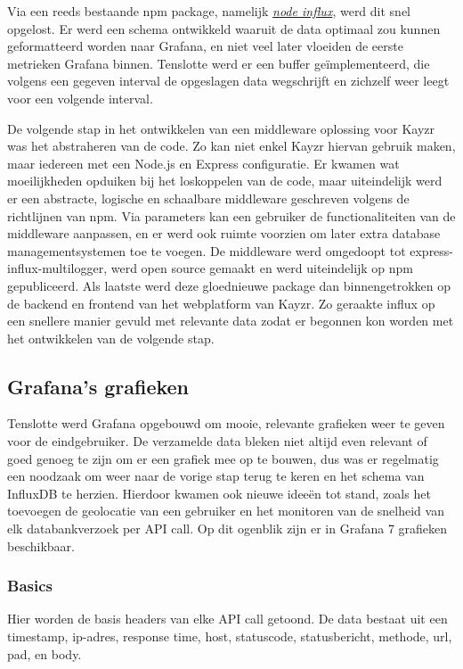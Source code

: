 Via een reeds bestaande npm package, namelijk \href{https://github.com/node-influx/node-influx}{\textit{node influx}}, werd dit snel opgelost. Er werd een schema ontwikkeld waaruit de data optimaal zou kunnen geformatteerd worden naar Grafana, en niet veel later vloeiden de eerste metrieken Grafana binnen. Tenslotte werd er een buffer geïmplementeerd, die volgens een gegeven interval de opgeslagen data wegschrijft en zichzelf weer leegt voor een volgende interval. 

De volgende stap in het ontwikkelen van een middleware oplossing voor Kayzr was het abstraheren van de code. Zo kan niet enkel Kayzr hiervan gebruik maken, maar iedereen met een Node.js en Express configuratie. Er kwamen wat moeilijkheden opduiken bij het loskoppelen van de code, maar uiteindelijk werd er een abstracte, logische en schaalbare middleware geschreven volgens de richtlijnen van npm. Via parameters kan een gebruiker de functionaliteiten van de middleware aanpassen, en er werd ook ruimte voorzien om later extra database managementsystemen toe te voegen. De middleware werd omgedoopt tot express-influx-multilogger, werd open source gemaakt en werd uiteindelijk op npm gepubliceerd. Als laatste werd deze gloednieuwe package dan binnengetrokken op de backend en frontend van het webplatform van Kayzr. Zo geraakte influx op een snellere manier gevuld met relevante data zodat er begonnen kon worden met het ontwikkelen van de volgende stap. 

\newpage
\subsection{Grafana's grafieken}
\label{sec:graphs}

Tenslotte werd Grafana opgebouwd om mooie, relevante grafieken weer te geven voor de eindgebruiker. De verzamelde data bleken niet altijd even relevant of goed genoeg te zijn om er een grafiek mee op te bouwen, dus was er regelmatig een noodzaak om weer naar de vorige stap terug te keren en het schema van InfluxDB te herzien. Hierdoor kwamen ook nieuwe ideeën tot stand, zoals het toevoegen de geolocatie van een gebruiker en het monitoren van de snelheid van elk databankverzoek per API call. Op dit ogenblik zijn er in Grafana 7 grafieken beschikbaar.

\subsubsection{Basics}
\label{sec:basics}
Hier worden de basis headers van elke API call getoond. De data bestaat uit een timestamp, ip-adres, response time, host, statuscode, statusbericht, methode, url, pad, en body. 

